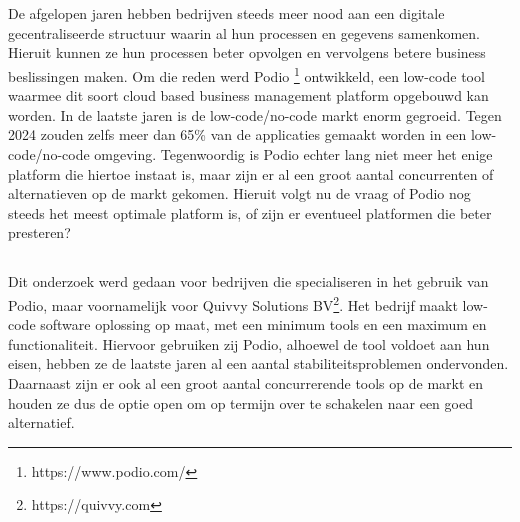 
\chapter{}%
\label{ch:inleiding} %

De afgelopen jaren hebben bedrijven steeds meer nood aan een digitale gecentraliseerde structuur waarin al hun processen en gegevens samenkomen. Hieruit kunnen ze hun processen beter opvolgen en vervolgens betere business beslissingen maken. Om die reden werd Podio \footnote{https://www.podio.com/} ontwikkeld, een low-code tool waarmee dit soort cloud based business management platform opgebouwd kan worden. In de laatste jaren is de low-code/no-code markt enorm gegroeid. Tegen 2024 zouden zelfs meer dan 65\% van de applicaties gemaakt worden in een low-code/no-code omgeving. Tegenwoordig is Podio echter lang niet meer het enige platform die hiertoe instaat is, maar zijn er al een groot aantal concurrenten of alternatieven op de markt gekomen. Hieruit volgt nu de vraag of Podio nog steeds het meest optimale platform is, of zijn er eventueel platformen die beter presteren? 

\section{}%
\label{sec:probleemstelling} %


Dit onderzoek werd gedaan voor bedrijven die specialiseren in het gebruik van Podio, maar voornamelijk voor Quivvy Solutions BV\footnote{https://quivvy.com}. Het bedrijf maakt low-code software oplossing op maat, met een minimum tools en een maximum en functionaliteit. Hiervoor gebruiken zij Podio, alhoewel de tool voldoet aan hun eisen, hebben ze de laatste jaren al een aantal stabiliteitsproblemen ondervonden. Daarnaast zijn er ook al een groot aantal concurrerende tools op de markt en houden ze dus de optie open om op termijn over te schakelen naar een goed alternatief. 

